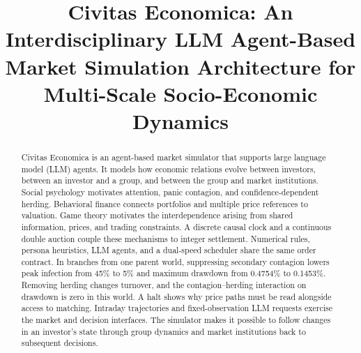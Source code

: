 \documentclass[sigconf,anonymous,review,balance=false]{acmart}
\begin{document}
\title[Civitas Economica: Multi-Scale Market Simulation]{Civitas Economica: An Interdisciplinary LLM Agent-Based Market Simulation Architecture for Multi-Scale Socio-Economic Dynamics}

\begin{abstract}
Civitas Economica is an agent-based market simulator that supports large language model (LLM) agents. It models how economic relations evolve between investors, between an investor and a group, and between the group and market institutions. Social psychology motivates attention, panic contagion, and confidence-dependent herding. Behavioral finance connects portfolios and multiple price references to valuation. Game theory motivates the interdependence arising from shared information, prices, and trading constraints. A discrete causal clock and a continuous double auction couple these mechanisms to integer settlement. Numerical rules, persona heuristics, LLM agents, and a dual-speed scheduler share the same order contract. In branches from one parent world, suppressing secondary contagion lowers peak infection from 45\% to 5\% and maximum drawdown from 0.4754\% to 0.1453\%. Removing herding changes turnover, and the contagion--herding interaction on drawdown is zero in this world. A halt shows why price paths must be read alongside access to matching. Intraday trajectories and fixed-observation LLM requests exercise the market and decision interfaces. The simulator makes it possible to follow changes in an investor's state through group dynamics and market institutions back to subsequent decisions.
\end{abstract}


\maketitle








\label{end:maintext}
\FloatBarrier
\label{start:references}



\clearpage

\end{document}
